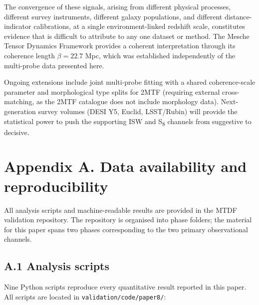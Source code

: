 \documentclass[11pt,a4paper]{article}
\begin{document}
The convergence of these signals, arising from different physical processes, different survey instruments, different galaxy populations, and different distance-indicator calibrations, at a single environment-linked redshift scale, constitutes evidence that is difficult to attribute to any one dataset or method. The Mesche Tensor Dynamics Framework provides a coherent interpretation through its coherence length \(\beta = 22.7\) Mpc, which was established independently of the multi-probe data presented here.

Ongoing extensions include joint multi-probe fitting with a shared coherence-scale parameter and morphological type splits for 2MTF (requiring external cross-matching, as the 2MTF catalogue does not include morphology data). Next-generation survey volumes (DESI Y5, Euclid, LSST/\allowbreak{}Rubin) will provide the statistical power to push the supporting ISW and S\textsubscript{8} channels from suggestive to decisive.

\section{Appendix A. Data availability and reproducibility}
\label{sec:secA}
All analysis scripts and machine-readable results are provided in the MTDF validation repository. The repository is organised into phase folders; the material for this paper spans two phases corresponding to the two primary observational channels.

\subsection{A.1 Analysis scripts}
Nine Python scripts reproduce every quantitative result reported in this paper. All scripts are located in \texttt{validation/\allowbreak{}code/\allowbreak{}paper8/\allowbreak{}}:
\end{document}

